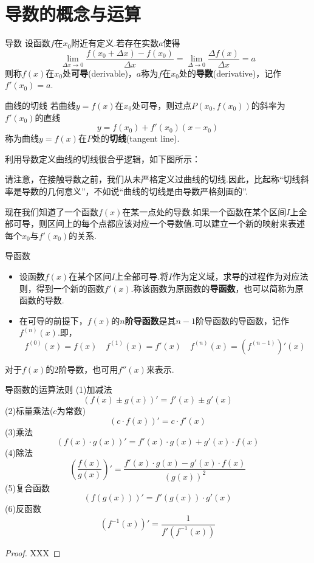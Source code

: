 \documentclass[lang=cn, zihao=5]{elegantbook}
\newcommand{\ssb}[1]{\left( #1 \right)}
\begin{document}
\section{导数的概念与运算}

\begin{definition}{导数}
	设函数$f$在$x_0$附近有定义.若存在实数$a$使得$$\lim_{\Delta x \to 0} {\frac{f(x_0+\Delta x)-f(x_0)}{\Delta x}} = \lim_{\Delta \to 0}{\frac{\Delta f(x)}{\Delta x}} = a$$
	则称$f(x)$在$x_0$处\textbf{可导}(derivable)，$a$称为$f$在$x_0$处的\textbf{导数}(derivative)，记作$f'(x_0)=a$.
\end{definition}

\begin{definition}{曲线的切线}
	若曲线$y=f(x)$在$x_0$处可导，则过点$P(x_0,f(x_0))$的斜率为$f'(x_0)$的直线$$y=f(x_0)+f'(x_0)(x-x_0)$$
	称为曲线$y=f(x)$在$P$处的\textbf{切线}(tangent line).
\end{definition}

利用导数定义曲线的切线很合乎逻辑，如下图所示：


请注意，在接触导数之前，我们从未严格定义过曲线的切线.因此，比起称“切线斜率是导数的几何意义”，不如说“曲线的切线是由导数严格刻画的”.

现在我们知道了一个函数$f(x)$在某一点处的导数.如果一个函数在某个区间$I$上全部可导，则区间上的每个点都应该对应一个导数值.可以建立一个新的映射来表述每个$x_0$与$f'(x_0)$的关系.

\begin{definition}{导函数}
	\begin{itemize}
		\item 设函数$f(x)$在某个区间$I$上全部可导.将$I$作为定义域，求导的过程作为对应法则，得到一个新的函数$f'(x)$.称该函数为原函数的\textbf{导函数}，也可以简称为原函数的导数.
		\item 在可导的前提下，$f(x)$的\textbf{$n$阶导函数}是其$n-1$阶导函数的导函数，记作$f^{(n)}(x)$.即，$$f^{(0)}(x)=f(x) \quad f^{(1)}(x)=f'(x) \quad f^{(n)}(x)=(f^{(n-1)})'(x)$$
	\end{itemize}
\end{definition}
\begin{remark}
	对于$f(x)$的$2$阶导数，也可用$f''(x)$来表示.
\end{remark}

\begin{theorem}{导函数的运算法则}
	(1)加减法$$(f(x) \pm g(x))'=f'(x) \pm g'(x)$$
	(2)标量乘法($c$为常数)$$(c \cdot f(x))'=c \cdot f'(x)$$
	(3)乘法$$(f(x) \cdot g(x))'=f'(x) \cdot g(x) + g'(x) \cdot f(x)$$
	(4)除法$$\ssb{ \frac{f(x)}{g(x)} }'=\frac{f'(x) \cdot g(x) - g'(x) \cdot f(x)}{(g(x))^2}$$
	(5)复合函数$$(f(g(x)))'=f'(g(x)) \cdot g'(x)$$
	(6)反函数$$(f^{-1}(x))'=\frac{1}{f'(f^{-1}(x))}$$
\end{theorem}
\begin{proof}
	XXX
\end{proof}
\end{document}
